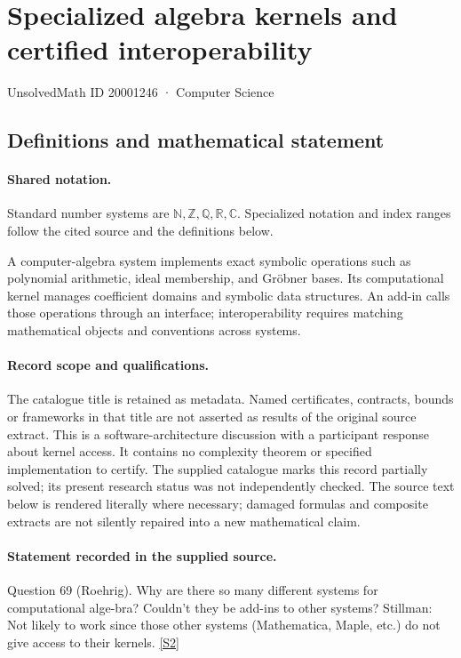 \documentclass[11pt]{article}
\newcommand{\sref}[2]{\hyperlink{source:#1:#2}{[S#2]}}
\begin{document}
\setcounter{section}{20001245}
\section{Specialized algebra kernels and certified interoperability}\label{20001246}
{\small\sffamily UnsolvedMath ID 20001246 · Computer Science}
\subsection{Definitions and mathematical statement}

\paragraph{Shared notation.}Standard number systems are $\mathbb N,\mathbb Z,\mathbb Q,\mathbb R,\mathbb C$. Specialized notation and index ranges follow the cited source and the definitions below.


A computer-algebra system implements exact symbolic operations such as polynomial arithmetic, ideal membership, and Gröbner bases. Its computational kernel manages coefficient domains and symbolic data structures. An add-in calls those operations through an interface; interoperability requires matching mathematical objects and conventions across systems.
\paragraph{Record scope and qualifications.}
The catalogue title is retained as metadata. Named certificates, contracts, bounds or frameworks in that title are not asserted as results of the original source extract.
This is a software-architecture discussion with a participant response about kernel access. It contains no complexity theorem or specified implementation to certify. The supplied catalogue marks this record partially solved; its present research status was not independently checked.
The source text below is rendered literally where necessary; damaged formulas and composite extracts are not silently repaired into a new mathematical claim.
\paragraph{Statement recorded in the supplied source.}
Question 69 (Roehrig). Why are there so many different systems for computational alge-bra? Couldn't they be add-ins to other systems? Stillman: Not likely to work since those other systems (Mathematica, Maple, etc.) do not give access to their kernels. \sref{20001246}{2}
\end{document}
